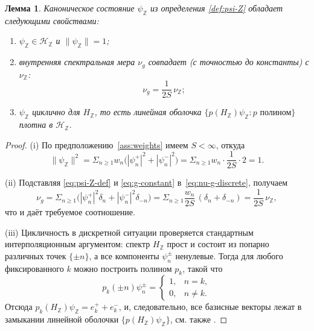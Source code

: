 \documentclass{article}
\numberwithin{equation}{section}
\theoremstyle{plain}
\newtheorem{lemma}{Лемма}
\theoremstyle{definition}
\theoremstyle{remark}
\def\delta{δ}\def\Delta{Δ}\def\epsilon{ε}\def\zeta{ζ}%
\def\infty{∞}\def\partial{∂}\def\sum{Σ}\def\int{∫}%
\def\cdot{·}\def\times{×}\def\pm{±}\def\mp{∓}\def\approx{≈}%
\begin{document}
\begin{lemma}
\label{lem:psi-Z-properties}
Каноническое состояние \(\psi_{\mathbb Z}\) из определения
\ref{def:psi-Z} обладает следующими свойствами:
\begin{enumerate}[label=(\roman*), leftmargin=2.3em]
  \item \(\psi_{\mathbb Z}\in\mathcal H_{\mathbb Z}\) и \(\|\psi_{\mathbb Z}\|=1\);
  \item внутренняя спектральная мера \(\nu_g\) совпадает
  (с точностью до константы) с \(\nu_{\mathbb Z}\):
  \begin{equation}
  \label{eq:nu-g-equal-nu-Z}
  \nu_g = \frac{1}{2S}\,\nu_{\mathbb Z};
  \end{equation}
  \item \(\psi_{\mathbb Z}\) циклично для \(H_{\mathbb Z}\), то есть линейная
  оболочка \(\{p(H_{\mathbb Z})\psi_{\mathbb Z}: p\text{ полином}\}\)
  плотна в \(\mathcal H_{\mathbb Z}\).
\end{enumerate}
\end{lemma}

\begin{proof}
(i) По предположению~\ref{ass:weights} имеем \(S<\infty\), откуда
\begin{equation}
\label{eq:psi-Z-norm}
\|\psi_{\mathbb Z}\|^2
=
\sum_{n\ge 1} w_n\big(|\psi_n^+|^2+|\psi_n^-|^2\big)
=
\sum_{n\ge 1} w_n\cdot\frac{1}{2S}\cdot 2
=
1.
\end{equation}

(ii) Подставляя \eqref{eq:psi-Z-def} и \eqref{eq:g-constant}
в~\eqref{eq:nu-g-discrete}, получаем
\begin{equation}
\label{eq:nu-g-computation}
\nu_g
=
\sum_{n\ge 1}
\Big(|\psi_n^+|^2\delta_n + |\psi_n^-|^2\delta_{-n}\Big)
=
\sum_{n\ge 1}
\frac{w_n}{2S}\,(\delta_n+\delta_{-n})
=
\frac{1}{2S}\,\nu_{\mathbb Z},
\end{equation}
что и даёт требуемое соотношение.

(iii) Цикличность в дискретной ситуации проверяется стандартным
интерполяционным аргументом: спектр \(H_{\mathbb Z}\) прост и состоит из
попарно различных точек \(\{\pm n\}\), а все компоненты \(\psi_n^\pm\)
ненулевые. Тогда для любого фиксированного \(k\) можно построить полином
\(p_k\), такой что
\begin{equation}
\label{eq:interpolation}
p_k(\pm n)\psi_n^\pm
=
\begin{cases}
1, & n=k,\\
0, & n\neq k.
\end{cases}
\end{equation}
Отсюда \(p_k(H_{\mathbb Z})\psi_{\mathbb Z}=e_k^++e_k^-\), и, следовательно,
все базисные векторы лежат в замыкании линейной оболочки
\(\{p(H_{\mathbb Z})\psi_{\mathbb Z}\}\), см. также
\cite{AkhiezerGlazman1993,ReedSimonI}.
\end{proof}
\end{document}
